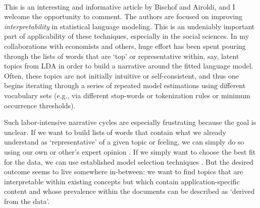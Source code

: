 \documentclass[12pt]{article}
\newcommand{\sgl}{\setstretch{1.2}}
\begin{document}
\sgl 

\pagestyle{empty}

~
\vskip 1cm 


\vskip 1cm


 

\vskip 2cm\noindent
This is an interesting and informative article by Bischof and Airoldi, and I welcome the opportunity to comment.  The authors are focused on improving  {\it interpretability} in statistical language modeling. This is an undeniably important part of applicability of these techniques, especially in the social sciences.  In my collaborations with economists and others, huge effort has been spent  pouring through the lists of words that are `top' or representative within, say, latent topics from LDA \citep{blei_latent_2003} in order to build a narrative around the fitted language model.  Often, these topics are not initially intuitive or self-consistent, and thus one begins iterating through a series of repeated model estimations using different vocabulary sets (e.g., via different stop-words or tokenization rules or minimum occurrence thresholds). 

Such labor-intensive narrative cycles are especially frustrating because the goal is unclear. If we want to build lists of words that contain what we already understand as `representative' of a given topic or feeling, we can simply do so using our own or other's expert opinion \citep[e.g.,][is an example of such `dictionary-based' analysis]{tetlock_giving_2007}.  If we simply want to choose the best fit for the data, we can use established model selection techniques \citep[e.g., the Bayes factors for LDA in][]{taddy_estimation_2012}.  But the desired outcome seems to live somewhere in-between: we want to find topics that are interpretable within existing concepts but which contain application-specific content and whose prevalence within the documents can be described as `derived from the data'.  
  
\end{document}

